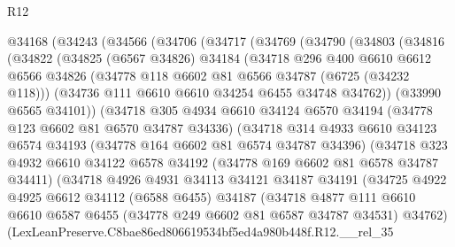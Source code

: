 \begin{lexlean}{R12}
\begin{coremodule}
  @34168
    (@34243
      (@34566
        (@34706
          (@34717
            (@34769
              (@34790
                (@34803
                  (@34816
                    (@34822
                      (@34825
                        (@6567 @34826)
                        @34184
                        (@34718
                          @296
                          @400
                          @6610
                          @6612
                          @6566
                          @34826
                          (@34778 @118 @6602 @81 @6566 @34787 (@6725 (@34232 @118)))
                          (@34736 @111 @6610 @6610 @34254 @6455 @34748 @34762))
                        (@33990 @6565 @34101))
                      (@34718
                        @305
                        @4934
                        @6610
                        @34124
                        @6570
                        @34194
                        (@34778 @123 @6602 @81 @6570 @34787 @34336)
                        (@34718
                          @314
                          @4933
                          @6610
                          @34123
                          @6574
                          @34193
                          (@34778 @164 @6602 @81 @6574 @34787 @34396)
                          (@34718
                            @323
                            @4932
                            @6610
                            @34122
                            @6578
                            @34192
                            (@34778 @169 @6602 @81 @6578 @34787 @34411)
                            (@34718
                              @4926
                              @4931
                              @34113
                              @34121
                              @34187
                              @34191
                              (@34725
                                @4922
                                @4925
                                @6612
                                @34112
                                (@6588 @6455)
                                @34187
                                (@34718
                                  @4877
                                  @111
                                  @6610
                                  @6610
                                  @6587
                                  @6455
                                  (@34778 @249 @6602 @81 @6587 @34787 @34531)
                                  @34762)
                                (LexLeanPreserve.C8bae86ed806619534bf5ed4a980b448f.R12.__rel_35

\end{coremodule}
\end{lexlean}
